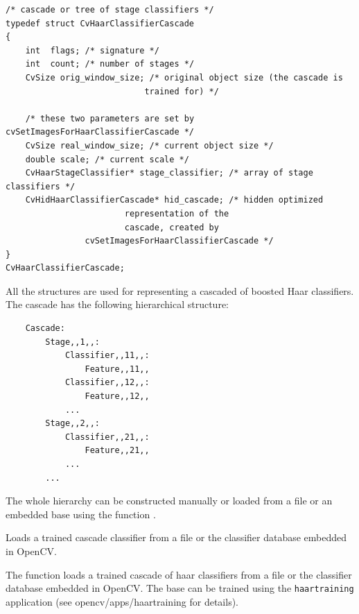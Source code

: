 \begin{lstlisting}
/* cascade or tree of stage classifiers */
typedef struct CvHaarClassifierCascade
{
    int  flags; /* signature */
    int  count; /* number of stages */
    CvSize orig_window_size; /* original object size (the cascade is 
                            trained for) */

    /* these two parameters are set by cvSetImagesForHaarClassifierCascade */
    CvSize real_window_size; /* current object size */
    double scale; /* current scale */
    CvHaarStageClassifier* stage_classifier; /* array of stage classifiers */
    CvHidHaarClassifierCascade* hid_cascade; /* hidden optimized 
                        representation of the 
                        cascade, created by 
                cvSetImagesForHaarClassifierCascade */
}
CvHaarClassifierCascade;
\end{lstlisting}

All the structures are used for representing a cascaded of boosted Haar classifiers. The cascade has the following hierarchical structure:

\begin{verbatim}
    Cascade:
        Stage,,1,,:
            Classifier,,11,,:
                Feature,,11,,
            Classifier,,12,,:
                Feature,,12,,
            ...
        Stage,,2,,:
            Classifier,,21,,:
                Feature,,21,,
            ...
        ...
\end{verbatim}

The whole hierarchy can be constructed manually or loaded from a file or an embedded base using the function .

Loads a trained cascade classifier from a file or the classifier database embedded in OpenCV.


\begin{description}
\end{description}

The function loads a trained cascade
of haar classifiers from a file or the classifier database embedded in
OpenCV. The base can be trained using the \texttt{haartraining} application
(see opencv/apps/haartraining for details).

